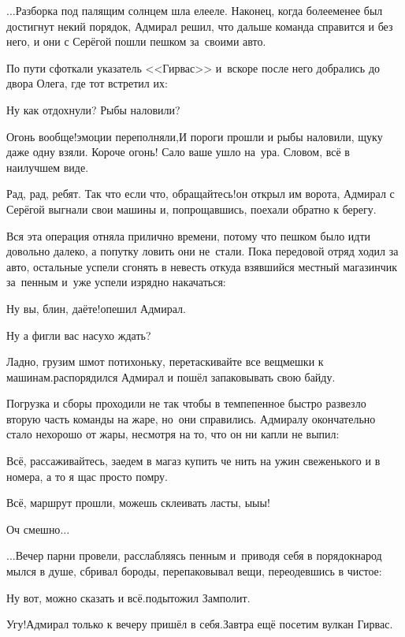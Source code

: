 $\ldots$Разборка под палящим солнцем шла еле\sdash еле. Наконец, когда более\sdash менее был достигнут некий порядок, Адмирал решил, что дальше команда справится и без него, и они с Серёгой пошли пешком за~своими авто.

По пути сфоткали указатель <<Гирвас>> и~вскоре после него добрались до двора Олега, где тот встретил их:

\diagdash Ну как отдохнули? Рыбы наловили?

\diagdash Огонь вообще!\mdash эмоции переполняли,\mdash И пороги прошли и рыбы наловили, щуку даже одну взяли. Короче огонь! Сало ваше ушло на~ура. Словом, всё в наилучшем виде.

\diagdash Рад, рад, ребят. Так что если что, обращайтесь!\mdash он открыл им ворота, Адмирал с Серёгой выгнали свои машины и, попрощавшись, поехали обратно к берегу.

Вся эта операция отняла прилично времени, потому что пешком было идти довольно далеко, а попутку ловить они не~стали. Пока передовой отряд ходил за авто, остальные успели сгонять в невесть откуда взявшийся местный магазинчик за~пенным и~уже успели изрядно накачаться:

\diagdash Ну вы, блин, даёте!\mdash опешил Адмирал.

\diagdash Ну а фигли вас насухо ждать?

\diagdash Ладно, грузим шмот потихоньку, перетаскивайте все вещмешки к машинам.\mdash распорядился Адмирал и пошёл запаковывать свою байду.

Погрузка и сборы проходили не так чтобы в темпе\mdash пенное быстро развезло вторую часть команды на жаре, но~они справились. Адмиралу окончательно стало нехорошо от жары, несмотря на то, что он ни капли не выпил:

\diagdash Всё, рассаживайтесь, заедем в магаз купить че нить на ужин свеженького и в номера, а то я щас просто помру.

\diagdash Всё, маршрут прошли, можешь склеивать ласты, ы\sdash ы\sdash ы!

\diagdash Оч смешно$\ldots$

\vspace{1em}
$\ldots$Вечер парни провели, расслабляясь пенным и~приводя себя в порядок\mdash народ мылся в душе, сбривал бороды, перепаковывал вещи, переодевшись в чистое:

\diagdash Ну вот, можно сказать и всё.\mdash подытожил Замполит.

\diagdash Угу!\mdash Адмирал только к вечеру пришёл в себя.\mdash Завтра ещё посетим вулкан Гирвас.

